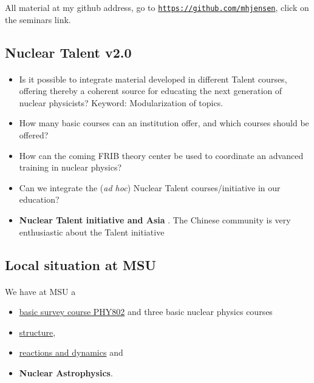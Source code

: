 \documentclass[%
twoside,                 %
final,                   %
10pt]{article}
\begin{document}
\noindent
All material at my github address, go to \href{{https://github.com/mhjensen}}{\nolinkurl{https://github.com/mhjensen}}, click on the seminars link.



\subsection{Nuclear Talent v2.0}

\paragraph{}
\begin{itemize}
\item Is it possible to integrate material developed in different Talent courses, offering thereby a coherent source for educating the next generation of nuclear physicists? Keyword: Modularization of topics.

\item How many basic courses can an institution offer, and which courses should be offered?

\item How can the coming FRIB theory center be used to coordinate an advanced training in nuclear physics?

\item Can we integrate the (\emph{ad hoc}) Nuclear Talent courses/initiative  in our education? 

\item \textbf{Nuclear Talent initiative and Asia} . The Chinese community is very enthusiastic about the Talent initiative
\end{itemize}

\noindent




\subsection{Local situation at MSU}

\paragraph{}

We have at MSU a  
\begin{itemize}
\item \href{{https://people.nscl.msu.edu/~witek/Classes/PHY802/NuclPhys802-2015.html}}{basic survey course PHY802}  and three basic nuclear physics courses 

\item \href{{http://nuclearstructure.github.io/PHY981/doc/web/course.html}}{structure}, 

\item \href{{https://people.nscl.msu.edu/~nunes/phy982/phy982web2015.htm}}{reactions and dynamics}  and 

\item \textbf{Nuclear Astrophysics}. 
\end{itemize}
\end{document}
